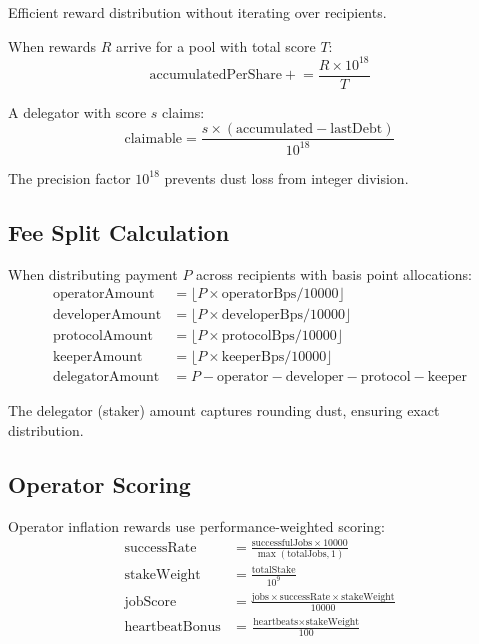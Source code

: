 \documentclass[11pt,a4paper]{article}
\begin{document}
Efficient reward distribution without iterating over recipients.

When rewards $R$ arrive for a pool with total score $T$:
\[
\text{accumulatedPerShare} \mathrel{+}= \frac{R \times 10^{18}}{T}
\]

A delegator with score $s$ claims:
\[
\text{claimable} = \frac{s \times (\text{accumulated} - \text{lastDebt})}{10^{18}}
\]

The precision factor $10^{18}$ prevents dust loss from integer division.

\subsection{Fee Split Calculation}

When distributing payment $P$ across recipients with basis point allocations:
\begin{align*}
\text{operatorAmount} &= \lfloor P \times \text{operatorBps} / 10000 \rfloor \\
\text{developerAmount} &= \lfloor P \times \text{developerBps} / 10000 \rfloor \\
\text{protocolAmount} &= \lfloor P \times \text{protocolBps} / 10000 \rfloor \\
\text{keeperAmount} &= \lfloor P \times \text{keeperBps} / 10000 \rfloor \\
\text{delegatorAmount} &= P - \text{operator} - \text{developer} - \text{protocol} - \text{keeper}
\end{align*}

The delegator (staker) amount captures rounding dust, ensuring exact distribution.

\subsection{Operator Scoring}

Operator inflation rewards use performance-weighted scoring:
\begin{align*}
\text{successRate} &= \frac{\text{successfulJobs} \times 10000}{\max(\text{totalJobs}, 1)} \\
\text{stakeWeight} &= \frac{\text{totalStake}}{10^9} \\
\text{jobScore} &= \frac{\text{jobs} \times \text{successRate} \times \text{stakeWeight}}{10000} \\
\text{heartbeatBonus} &= \frac{\text{heartbeats} \times \text{stakeWeight}}{100}
\end{align*}
\end{document}
